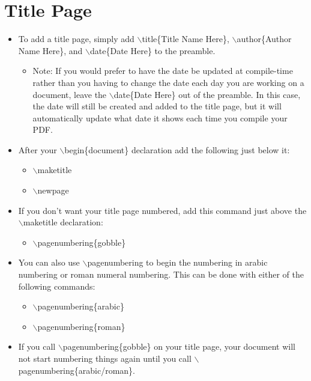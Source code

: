 \section{Title Page}
	\begin{itemize}
		\item To add a title page, simply add $\backslash$title\{Title Name Here\}, $\backslash$author\{Author Name Here\}, and $\backslash$date\{Date Here\} to the preamble.
		\begin{itemize}
			\item Note: If you would prefer to  have the date be updated at compile-time rather than you having to change the date each day you are working on a document, leave the $\backslash$date\{Date Here\} out of the preamble. In this case, the date will still be created and added to the title page, but it will automatically update what date it shows each time you compile your PDF.
		\end{itemize}
		\item After your $\backslash$begin\{document\} declaration add the following just below it:
		\begin{itemize}
			\item $\backslash$maketitle
			\item $\backslash$newpage
		\end{itemize}
		\item If you don\rq{}t want your title page numbered, add this command just above the $\backslash$maketitle declaration:
		\begin{itemize}
			\item $\backslash$pagenumbering\{gobble\}
		\end{itemize}
		\item You can also use $\backslash$pagenumbering to begin the numbering in arabic numbering or roman numeral numbering. This can be done with either of the following commands:
		\begin{itemize}
			\item $\backslash$pagenumbering\{arabic\}
			\item $\backslash$pagenumbering\{roman\}
		\end{itemize}
		\item If you call $\backslash$pagenumbering\{gobble\} on your title page, your document will not start numbering things again until you call $\backslash$pagenumbering\{arabic/roman\}.
	\end{itemize}

